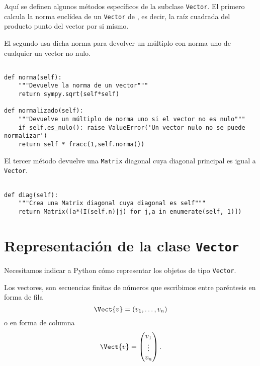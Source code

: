 \documentclass[11pt]{report}
\begin{document}
Aquí se definen algunos métodos específicos de la subclase
\texttt{Vector}. El primero calcula la norma euclídea de un \texttt{Vector} de
\R[n], es decir, la raíz cuadrada del producto punto del vector por si
mismo.

El segundo usa dicha norma para devolver un múltiplo con norma uno de
cualquier un vector no nulo.

\begin{verbatim}

def norma(self):
    """Devuelve la norma de un vector"""
    return sympy.sqrt(self*self)
                                                               
def normalizado(self):
    """Devuelve un múltiplo de norma uno si el vector no es nulo"""
    if self.es_nulo(): raise ValueError('Un vector nulo no se puede normalizar')
    return self * fracc(1,self.norma())

\end{verbatim}

El tercer método devuelve una \texttt{Matrix} diagonal cuya diagonal
principal es igual a \texttt{Vector}.

\begin{verbatim}

def diag(self):
    """Crea una Matrix diagonal cuya diagonal es self"""
    return Matrix([a*(I(self.n)|j) for j,a in enumerate(self, 1)])

\end{verbatim}

\section{Representación de la clase \texttt{Vector}}
\label{sec:org66a99c9}

Necesitamos indicar a Python cómo representar los objetos de tipo
\texttt{Vector}.

Los vectores, son secuencias finitas de números que escribimos entre
paréntesis en forma de fila
\begin{displaymath}
  \Vect{v}=(v_1,\ldots,v_n)
\end{displaymath}
o en forma de columna
\begin{displaymath}
  \Vect{v}=\begin{pmatrix}v_1\\ \vdots \\ v_n\end{pmatrix}.
\end{displaymath}
\end{document}
